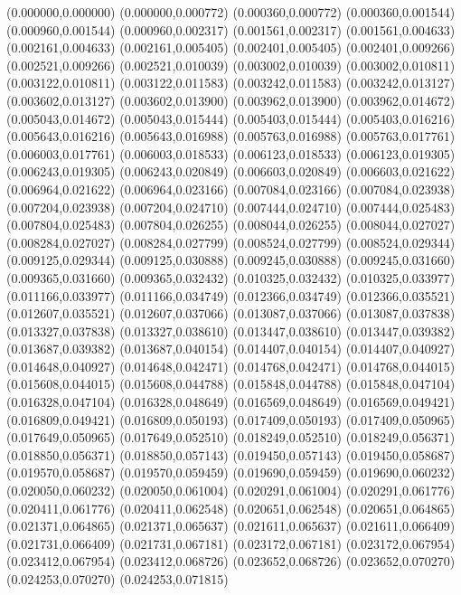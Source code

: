 (0.000000,0.000000)
(0.000000,0.000772)
(0.000360,0.000772)
(0.000360,0.001544)
(0.000960,0.001544)
(0.000960,0.002317)
(0.001561,0.002317)
(0.001561,0.004633)
(0.002161,0.004633)
(0.002161,0.005405)
(0.002401,0.005405)
(0.002401,0.009266)
(0.002521,0.009266)
(0.002521,0.010039)
(0.003002,0.010039)
(0.003002,0.010811)
(0.003122,0.010811)
(0.003122,0.011583)
(0.003242,0.011583)
(0.003242,0.013127)
(0.003602,0.013127)
(0.003602,0.013900)
(0.003962,0.013900)
(0.003962,0.014672)
(0.005043,0.014672)
(0.005043,0.015444)
(0.005403,0.015444)
(0.005403,0.016216)
(0.005643,0.016216)
(0.005643,0.016988)
(0.005763,0.016988)
(0.005763,0.017761)
(0.006003,0.017761)
(0.006003,0.018533)
(0.006123,0.018533)
(0.006123,0.019305)
(0.006243,0.019305)
(0.006243,0.020849)
(0.006603,0.020849)
(0.006603,0.021622)
(0.006964,0.021622)
(0.006964,0.023166)
(0.007084,0.023166)
(0.007084,0.023938)
(0.007204,0.023938)
(0.007204,0.024710)
(0.007444,0.024710)
(0.007444,0.025483)
(0.007804,0.025483)
(0.007804,0.026255)
(0.008044,0.026255)
(0.008044,0.027027)
(0.008284,0.027027)
(0.008284,0.027799)
(0.008524,0.027799)
(0.008524,0.029344)
(0.009125,0.029344)
(0.009125,0.030888)
(0.009245,0.030888)
(0.009245,0.031660)
(0.009365,0.031660)
(0.009365,0.032432)
(0.010325,0.032432)
(0.010325,0.033977)
(0.011166,0.033977)
(0.011166,0.034749)
(0.012366,0.034749)
(0.012366,0.035521)
(0.012607,0.035521)
(0.012607,0.037066)
(0.013087,0.037066)
(0.013087,0.037838)
(0.013327,0.037838)
(0.013327,0.038610)
(0.013447,0.038610)
(0.013447,0.039382)
(0.013687,0.039382)
(0.013687,0.040154)
(0.014407,0.040154)
(0.014407,0.040927)
(0.014648,0.040927)
(0.014648,0.042471)
(0.014768,0.042471)
(0.014768,0.044015)
(0.015608,0.044015)
(0.015608,0.044788)
(0.015848,0.044788)
(0.015848,0.047104)
(0.016328,0.047104)
(0.016328,0.048649)
(0.016569,0.048649)
(0.016569,0.049421)
(0.016809,0.049421)
(0.016809,0.050193)
(0.017409,0.050193)
(0.017409,0.050965)
(0.017649,0.050965)
(0.017649,0.052510)
(0.018249,0.052510)
(0.018249,0.056371)
(0.018850,0.056371)
(0.018850,0.057143)
(0.019450,0.057143)
(0.019450,0.058687)
(0.019570,0.058687)
(0.019570,0.059459)
(0.019690,0.059459)
(0.019690,0.060232)
(0.020050,0.060232)
(0.020050,0.061004)
(0.020291,0.061004)
(0.020291,0.061776)
(0.020411,0.061776)
(0.020411,0.062548)
(0.020651,0.062548)
(0.020651,0.064865)
(0.021371,0.064865)
(0.021371,0.065637)
(0.021611,0.065637)
(0.021611,0.066409)
(0.021731,0.066409)
(0.021731,0.067181)
(0.023172,0.067181)
(0.023172,0.067954)
(0.023412,0.067954)
(0.023412,0.068726)
(0.023652,0.068726)
(0.023652,0.070270)
(0.024253,0.070270)
(0.024253,0.071815)
